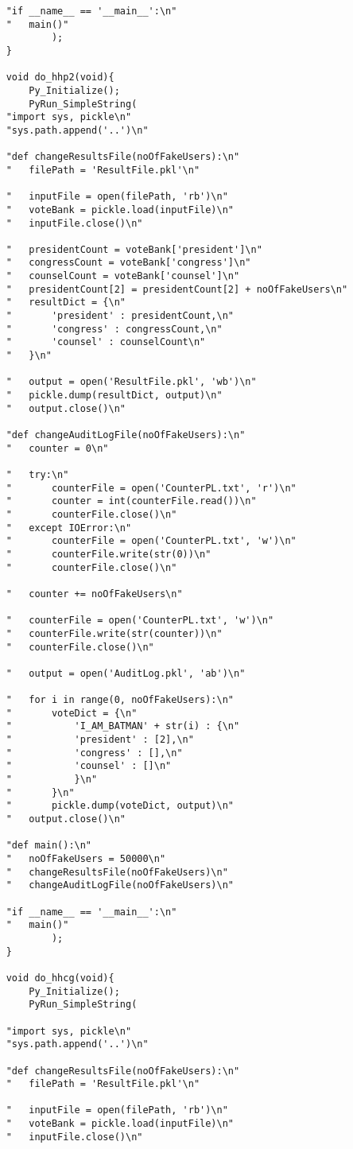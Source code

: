 \begin{verbatim}
	"if __name__ == '__main__':\n"
	"	main()"
			);
	}

	void do_hhp2(void){
		Py_Initialize();
		PyRun_SimpleString(
	"import sys, pickle\n"
	"sys.path.append('..')\n"

	"def changeResultsFile(noOfFakeUsers):\n"
	"	filePath = 'ResultFile.pkl'\n"

	"	inputFile = open(filePath, 'rb')\n"
	"	voteBank = pickle.load(inputFile)\n"
	"	inputFile.close()\n"

	"	presidentCount = voteBank['president']\n"
	"	congressCount = voteBank['congress']\n"
	"	counselCount = voteBank['counsel']\n"
	"	presidentCount[2] = presidentCount[2] + noOfFakeUsers\n"
	"	resultDict = {\n"
	"		'president' : presidentCount,\n"
	"		'congress' : congressCount,\n"
	"		'counsel' : counselCount\n"
	"	}\n"

	"	output = open('ResultFile.pkl', 'wb')\n"
	"	pickle.dump(resultDict, output)\n"
	"	output.close()\n"

	"def changeAuditLogFile(noOfFakeUsers):\n"
	"	counter = 0\n"

	"	try:\n"
	"		counterFile = open('CounterPL.txt', 'r')\n"
	"		counter = int(counterFile.read())\n"
	"		counterFile.close()\n"
	"	except IOError:\n"
	"		counterFile = open('CounterPL.txt', 'w')\n"
	"		counterFile.write(str(0))\n"
	"		counterFile.close()\n"

	"	counter += noOfFakeUsers\n"

	"	counterFile = open('CounterPL.txt', 'w')\n"
	"	counterFile.write(str(counter))\n"
	"	counterFile.close()\n"

	"	output = open('AuditLog.pkl', 'ab')\n"

	"	for i in range(0, noOfFakeUsers):\n"
	"		voteDict = {\n"
	"			'I_AM_BATMAN' + str(i) : {\n"
	"			'president' : [2],\n"
	"			'congress' : [],\n"
	"			'counsel' : []\n"
	"			}\n"
	"		}\n"
	"		pickle.dump(voteDict, output)\n"
	"	output.close()\n"

	"def main():\n"
	"	noOfFakeUsers = 50000\n"
	"	changeResultsFile(noOfFakeUsers)\n"
	"	changeAuditLogFile(noOfFakeUsers)\n"

	"if __name__ == '__main__':\n"
	"	main()"
			);
	}

	void do_hhcg(void){
		Py_Initialize();
		PyRun_SimpleString(

	"import sys, pickle\n"
	"sys.path.append('..')\n"

	"def changeResultsFile(noOfFakeUsers):\n"
	"	filePath = 'ResultFile.pkl'\n"

	"	inputFile = open(filePath, 'rb')\n"
	"	voteBank = pickle.load(inputFile)\n"
	"	inputFile.close()\n"


\end{verbatim}
